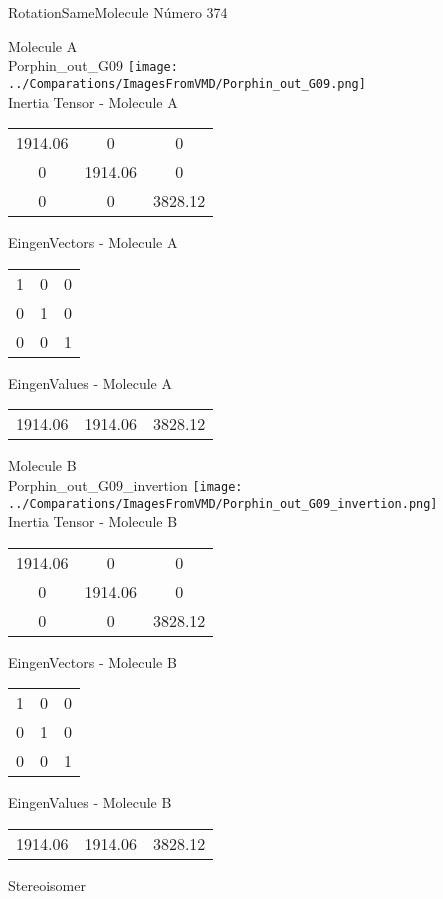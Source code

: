  \newpage

\vtab[-2cm]
\begin{center}
{\large RotationSameMolecule \tab Número 374}
\end{center}
\begin{multicols}{2}
\begin{center}

Molecule A \\ 
Porphin\_out\_G09
\texttt{[image: ../Comparations/ImagesFromVMD/Porphin\_out\_G09.png]}
\\
Inertia Tensor - Molecule A \\
\vtab

\begin{tabular}{|c c c|}
1914.06	 & 	0	 & 	0	 \\
0	 & 	1914.06	 & 	0	 \\
0	 & 	0	 & 	3828.12
\end{tabular}

\vtab
 EingenVectors - Molecule A     \\
\vtab
\begin{tabular}{|c c c|}
1	 & 	0	 & 	0	 \\
0	 & 	1	 & 	0	 \\
0	 & 	0	 & 	1
\end{tabular}

\vtab
 EingenValues - Molecule A     \\
\vtab
\begin{tabular}{|c c c|}
1914.06	 & 	1914.06	 & 	3828.12	 \\
\end{tabular}
\columnbreak

Molecule B \\ 
Porphin\_out\_G09\_invertion
\texttt{[image: ../Comparations/ImagesFromVMD/Porphin\_out\_G09\_invertion.png]}
\\
Inertia Tensor - Molecule B \\
\vtab

\begin{tabular}{|c c c|}
1914.06	 & 	0	 & 	0	 \\
0	 & 	1914.06	 & 	0	 \\
0	 & 	0	 & 	3828.12
\end{tabular}

\vtab
 EingenVectors - Molecule B     \\
\vtab
\begin{tabular}{|c c c|}
1	 & 	0	 & 	0	 \\
0	 & 	1	 & 	0	 \\
0	 & 	0	 & 	1
\end{tabular}

\vtab
 EingenValues - Molecule B     \\
\vtab
\begin{tabular}{|c c c|}
1914.06	 & 	1914.06	 & 	3828.12	 \\
\end{tabular}

\end{center}
\end{multicols}
\begin{center}
\vtab
\vtab
\textcolor{NavyBlue}{\Large Stereoisomer}
\end{center}

